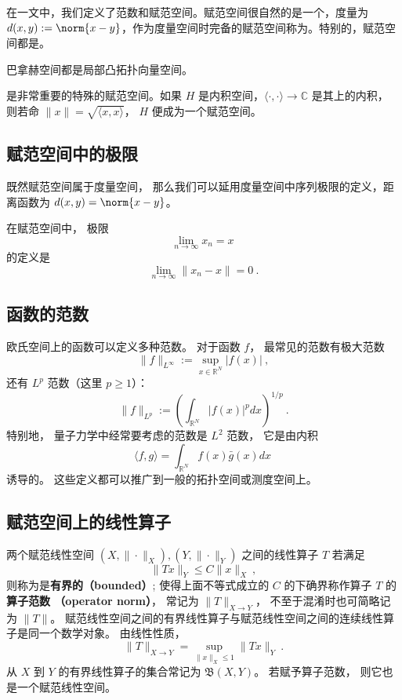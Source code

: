 
\begin{issues}
\issueDraft
\end{issues}


在一文中，我们定义了范数和赋范空间。赋范空间很自然的是一个，度量为 $d(x,y) := \norm{x-y}$，作为度量空间时完备的赋范空间称为。特别的，赋范空间都是。

\begin{theorem}{}
巴拿赫空间都是局部凸拓扑向量空间。
\end{theorem}

是非常重要的特殊的赋范空间。如果 $H$ 是内积空间，$\langle\cdot,\cdot\rangle\to\mathbb C$ 是其上的内积， 则若命 $\|x\|=\sqrt{\langle x,x\rangle }$， $H$ 便成为一个赋范空间。

\subsection{赋范空间中的极限}
既然赋范空间属于度量空间， 那么我们可以延用度量空间中序列极限的定义，距离函数为 $d(x, y) = \norm{x - y}$。

在赋范空间中， 极限
\begin{equation}
\lim_{n\to\infty} x_n = x~
\end{equation}
的定义是
\begin{equation}
\lim_{n\to\infty} \|{x_n - x}\|= 0~.
\end{equation}


\subsection{函数的范数}
欧氏空间上的函数可以定义多种范数。 对于函数 $f$， 最常见的范数有极大范数
$$
\|f\|_{L^\infty}:=\sup_{x\in\mathbb{R}^N}|f(x)|~,
$$
还有 $L^p$ 范数（这里 $p\geq1$）：
$$
\|f\|_{L^p}:=\left(\int_{\mathbb{R}^N}|f(x)|^pdx\right)^{1/p}~.
$$
特别地， 量子力学中经常要考虑的范数是 $L^2$ 范数， 它是由内积
$$
\langle f,g\rangle=\int_{\mathbb{R}^N}f(x)\bar g(x)dx~
$$
诱导的。 这些定义都可以推广到一般的拓扑空间或测度空间上。

\subsection{赋范空间上的线性算子}
两个赋范线性空间 $(X,\|\cdot\|_X),(Y,\|\cdot\|_Y)$ 之间的线性算子 $T$ 若满足
$$
\|Tx\|_Y\leq C\|x\|_X~,
$$
则称为是\textbf{有界的（bounded）}; 使得上面不等式成立的 $C$ 的下确界称作算子 $T$ 的\textbf{算子范数 （operator norm）}， 常记为 $\|T\|_{X\to Y}$， 不至于混淆时也可简略记为 $\|T\|$。 赋范线性空间之间的有界线性算子与赋范线性空间之间的连续线性算子是同一个数学对象。 由线性性质，
$$
\|T\|_{X\to Y}=\sup_{\|x\|_X\leq 1}\|Tx\|_Y~.
$$
从 $X$ 到 $Y$ 的有界线性算子的集合常记为 $\mathfrak{B}(X,Y)$。 若赋予算子范数， 则它也是一个赋范线性空间。

